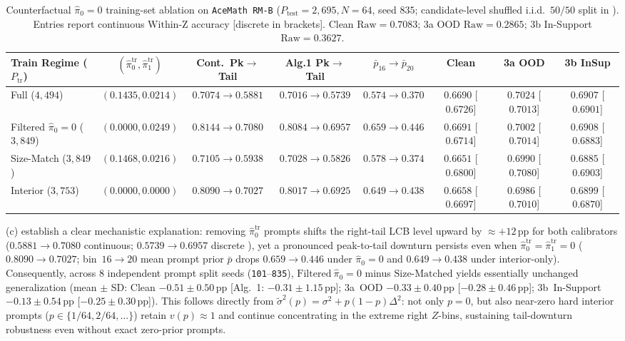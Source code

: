 \documentclass[10pt]{article}
\theoremstyle{plain}
\theoremstyle{definition}
\theoremstyle{remark}
\begin{document}
\begin{table}[htbp]
\centering
\caption{Counterfactual $\hat{\pi}_0 = 0$ training-set ablation on \texttt{AceMath RM-B} ($P_{\mathrm{test}}=2{,}695, N=64$, seed $835$; candidate-level shuffled i.i.d.\ $50/50$ split in ). Entries report continuous $\mathrm{Within\text{-}Z}$ accuracy [discrete  in brackets]. Clean $\mathrm{Raw}=0.7083$; 3a OOD $\mathrm{Raw}=0.2865$; 3b In-Support $\mathrm{Raw}=0.3627$.}
\label{tab:pi0-ablation}
\scriptsize
\setlength{\tabcolsep}{1.1pt}
\begin{tabular}{lccccccc}
\toprule
Train Regime ($P_{\mathrm{tr}}$) & $(\hat{\pi}_0^{\mathrm{tr}}, \hat{\pi}_1^{\mathrm{tr}})$ & Cont.\ Pk$\to$Tail & Alg.1 Pk$\to$Tail & $\bar{p}_{16}\!\to\!\bar{p}_{20}$ & Clean & 3a OOD & 3b InSup \\
\midrule
Full ($4{,}494$)            & $(0.1435, 0.0214)$ & $0.7074\!\to\!0.5881$ & $0.7016\!\to\!0.5739$ & $0.574\!\to\!0.370$ & $0.6690$ [$0.6726$] & $0.7024$ [$0.7013$] & $0.6907$ [$0.6901$] \\
Filtered $\hat{\pi}_0=0$ ($3{,}849$) & $(0.0000, 0.0249)$ & $0.8144\!\to\!0.7080$ & $0.8084\!\to\!0.6957$ & $0.659\!\to\!0.446$ & $0.6691$ [$0.6714$] & $0.7002$ [$0.7014$] & $0.6908$ [$0.6883$] \\
Size-Match ($3{,}849$)      & $(0.1468, 0.0216)$ & $0.7105\!\to\!0.5938$ & $0.7028\!\to\!0.5826$ & $0.578\!\to\!0.374$ & $0.6651$ [$0.6800$] & $0.6990$ [$0.7080$] & $0.6885$ [$0.6903$] \\
Interior ($3{,}753$)        & $(0.0000, 0.0000)$ & $0.8090\!\to\!0.7027$ & $0.8017\!\to\!0.6925$ & $0.649\!\to\!0.438$ & $0.6658$ [$0.6697$] & $0.6986$ [$0.7010$] & $0.6899$ [$0.6870$] \\
\bottomrule
\end{tabular}
\end{table}

(c) establish a clear mechanistic explanation: removing $\hat{\pi}_0^{\mathrm{tr}}$ prompts shifts the right-tail LCB level upward by $\approx +12\,\mathrm{pp}$ for both calibrators ($0.5881 \to 0.7080$ continuous; $0.5739 \to 0.6957$ discrete ), yet a pronounced peak-to-tail downturn persists even when $\hat{\pi}_0^{\mathrm{tr}} = \hat{\pi}_1^{\mathrm{tr}} = 0$ ($0.8090 \to 0.7027$;  bin~$16 \to 20$ mean prompt prior $\bar{p}$ drops $0.659 \to 0.446$ under $\hat{\pi}_0=0$ and $0.649 \to 0.438$ under interior-only). Consequently, across 8 independent prompt split seeds (\texttt{101}--\texttt{835}), $\mathrm{Filtered}\ \hat{\pi}_0=0$ minus $\mathrm{Size\text{-}Matched}$ yields essentially unchanged generalization (mean $\pm$ SD: Clean $-0.51 \pm 0.50\,\mathrm{pp}$ [Alg.~1: $-0.31 \pm 1.15\,\mathrm{pp}$]; 3a~OOD $-0.33 \pm 0.40\,\mathrm{pp}$ [$-0.28 \pm 0.46\,\mathrm{pp}$]; 3b~In-Support $-0.13 \pm 0.54\,\mathrm{pp}$ [$-0.25 \pm 0.30\,\mathrm{pp}$]). This follows directly from $\tilde{\sigma}^2(p) = \sigma^2 + p(1-p)\Delta^2$: not only $p=0$, but also near-zero hard interior prompts ($p \in \{1/64, 2/64, \dots\}$) retain $v(p) \approx 1$ and continue concentrating in the extreme right $Z$-bins, sustaining tail-downturn robustness even without exact zero-prior prompts.
\end{document}
